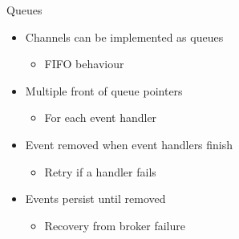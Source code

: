 \documentclass{slide}
\begin{document}
\begin{frame}{Queues}
    \vspace{1mm}
    {\LARGE
    \begin{itemize}
        \item Channels can be implemented as queues
        \begin{itemize}
            \Large\item FIFO behaviour
        \end{itemize}
        \vspace{3mm}
        \item<2-> Multiple front of queue pointers
        \begin{itemize}
            \Large\item For each event handler
        \end{itemize}
        \vspace{3mm}
        \item<3-> Event removed when event handlers finish
        \begin{itemize}
            \Large\item Retry if a handler fails
        \end{itemize}
        \vspace{3mm}
        \item<4-> Events persist until removed
        \begin{itemize}
            \Large\item Recovery from broker failure
        \end{itemize}
    \end{itemize}
    }
\end{frame}
\end{document}
